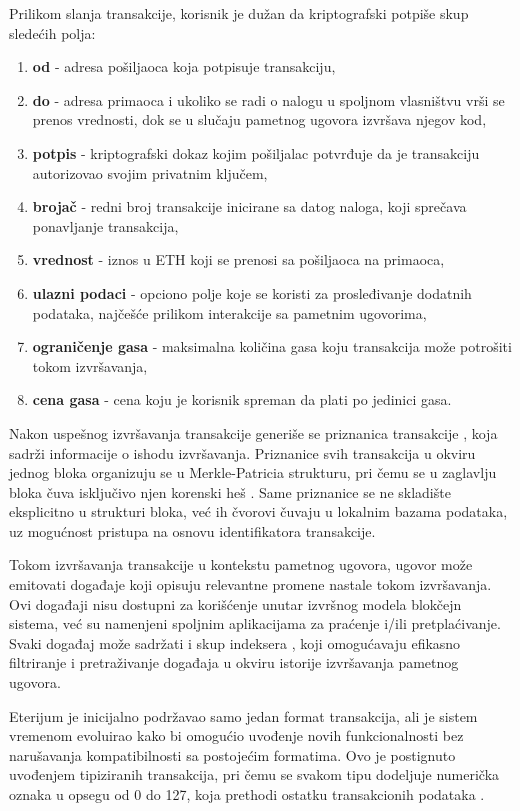 Prilikom slanja transakcije, korisnik je dužan da kriptografski potpiše skup sledećih polja:
\begin{enumerate}
\item \textbf{od} - adresa pošiljaoca koja potpisuje transakciju,
\item \textbf{do} - adresa primaoca i ukoliko se radi o nalogu u spoljnom vlasništvu vrši se prenos vrednosti, dok se u slučaju pametnog ugovora izvršava njegov kod,
\item \textbf{potpis} - kriptografski dokaz kojim pošiljalac potvrđuje da je transakciju autorizovao svojim privatnim ključem,
\item \textbf{brojač} - redni broj transakcije inicirane sa datog naloga, koji sprečava ponavljanje transakcija,
\item \textbf{vrednost} - iznos u ETH koji se prenosi sa pošiljaoca na primaoca,
\item \textbf{ulazni podaci} - opciono polje koje se koristi za prosleđivanje dodatnih podataka, najčešće prilikom interakcije sa pametnim ugovorima,
\item \textbf{ograničenje gasa}  - maksimalna količina gasa koju transakcija može potrošiti tokom izvršavanja,
\item \textbf{cena gasa} - cena koju je korisnik spreman da plati po jedinici gasa.
\end{enumerate}

Nakon uspešnog izvršavanja transakcije generiše se priznanica transakcije , koja sadrži informacije o ishodu izvršavanja. Priznanice svih transakcija u okviru jednog bloka organizuju se u Merkle-Patricia strukturu, pri čemu se u zaglavlju bloka čuva isključivo njen korenski heš . Same priznanice se ne skladište eksplicitno u strukturi bloka, već ih čvorovi čuvaju u lokalnim bazama podataka, uz mogućnost pristupa na osnovu identifikatora transakcije.

Tokom izvršavanja transakcije u kontekstu pametnog ugovora, ugovor može emitovati događaje  koji opisuju relevantne promene nastale tokom izvršavanja. Ovi događaji nisu dostupni za korišćenje unutar izvršnog modela blokčejn sistema, već su namenjeni spoljnim aplikacijama za praćenje i/ili pretplaćivanje. Svaki događaj može sadržati i skup indeksera , koji omogućavaju efikasno filtriranje i pretraživanje događaja u okviru istorije izvršavanja pametnog ugovora.

Eterijum je inicijalno podržavao samo jedan format transakcija, ali je sistem vremenom evoluirao kako bi omogućio uvođenje novih funkcionalnosti bez narušavanja kompatibilnosti sa postojećim formatima. Ovo je postignuto uvođenjem tipiziranih transakcija, pri čemu se svakom tipu dodeljuje numerička oznaka u opsegu od 0 do 127, koja prethodi ostatku transakcionih podataka \cite{TXTYPEeip2718}.

